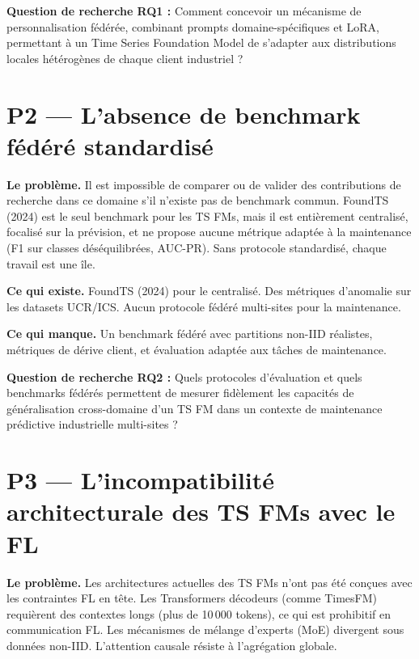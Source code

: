 \documentclass[12pt, a4paper]{report}
\begin{document}
\begin{infobox}
\textbf{Question de recherche RQ1 :} Comment concevoir un mécanisme de personnalisation
fédérée, combinant prompts domaine-spécifiques et LoRA, permettant à un Time Series
Foundation Model de s'adapter aux distributions locales hétérogènes de chaque client
industriel ?
\end{infobox}

\section{P2 — L'absence de benchmark fédéré standardisé}

\textbf{Le problème.} Il est impossible de comparer ou de valider des contributions
de recherche dans ce domaine s'il n'existe pas de benchmark commun. FoundTS (2024)
est le seul benchmark pour les TS FMs, mais il est entièrement centralisé, focalisé
sur la prévision, et ne propose aucune métrique adaptée à la maintenance (F1 sur classes
déséquilibrées, AUC-PR). Sans protocole standardisé, chaque travail est une île.

\textbf{Ce qui existe.} FoundTS (2024) pour le centralisé. Des métriques d'anomalie
sur les datasets UCR/ICS. Aucun protocole fédéré multi-sites pour la maintenance.

\textbf{Ce qui manque.} Un benchmark fédéré avec partitions non-IID réalistes,
métriques de dérive client, et évaluation adaptée aux tâches de maintenance.

\begin{infobox}
\textbf{Question de recherche RQ2 :} Quels protocoles d'évaluation et quels benchmarks
fédérés permettent de mesurer fidèlement les capacités de généralisation cross-domaine
d'un TS FM dans un contexte de maintenance prédictive industrielle multi-sites ?
\end{infobox}

\section{P3 — L'incompatibilité architecturale des TS FMs avec le FL}

\textbf{Le problème.} Les architectures actuelles des TS FMs n'ont pas été conçues
avec les contraintes FL en tête. Les Transformers décodeurs (comme TimesFM) requièrent
des contextes longs (plus de 10\,000 tokens), ce qui est prohibitif en communication
FL. Les mécanismes de mélange d'experts (MoE) divergent sous données non-IID.
L'attention causale résiste à l'agrégation globale.
\end{document}
